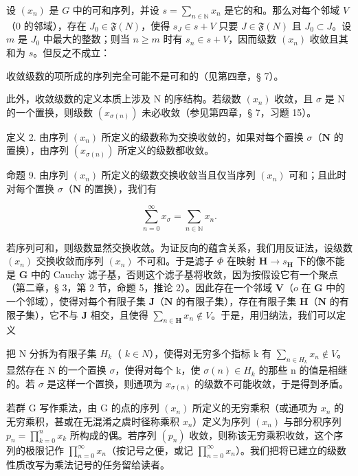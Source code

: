 设 \((x_{n})\) 是 \(G\) 中的可和序列，并设 \(s = \sum_{n\in \mathbb{N}}x_n\) 是它的和。那么对每个邻域 \(V\)（\(0\) 的邻域），存在 \(J_0\in \mathfrak{F}(N)\)，使得 \(s_J\in s + V\) 只要 \(J\in \mathfrak{F}(N)\) 且 \(J_0\subset J\)。设 \(m\) 是 \(J_0\) 中最大的整数；则当 \(n\geqslant m\) 时有 \(s_n\in s + V\)，因而级数 \((x_{n})\) 收敛且其和为 \(s\)。但反之不成立：

收敛级数的项所成的序列完全可能不是可和的（见第四章，§ 7）。

此外，收敛级数的定义本质上涉及 N 的序结构。若级数 \((x_{n})\) 收敛，且 \(\sigma\) 是 N 的一个置换，则级数 \((x_{\sigma(n)})\) 未必收敛（参见第四章，§ 7，习题 15）。

定义 2. 由序列 \((x_{n})\) 所定义的级数称为交换收敛的，如果对每个置换 \(\sigma\)（\(\mathbf{N}\) 的置换），由序列 \((x_{\sigma(n)})\) 所定义的级数都收敛。

命题 9. 由序列 \((x_{n})\) 所定义的级数交换收敛当且仅当序列 \((x_{n})\) 可和；且此时对每个置换 \(\sigma\)（\(\mathbf{N}\) 的置换），我们有

\[
\sum_ {n = 0} ^ {\infty} x _ {\sigma} = \sum_ {n \in \mathbb {N}} x _ {n}.
\]

若序列可和，则级数显然交换收敛。为证反向的蕴含关系，我们用反证法，设级数 \((x_{n})\) 交换收敛而序列 \((x_{n})\) 不可和。于是滤子 \(\Phi\) 在映射 \(\mathbf{H} \to s_{\mathbf{H}}\) 下的像不能是 \(\mathbf{G}\) 中的 Cauchy 滤子基，否则这个滤子基将收敛，因为按假设它有一个聚点（第二章，§ 3，第 2 节，命题 5，推论 2）。因此存在一个邻域 \(\mathbf{V}\)（\(o\) 在 \(\mathbf{G}\) 中的一个邻域），使得对每个有限子集 \(\mathbf{J}\)（\(\mathbf{N}\) 的有限子集），存在有限子集 \(\mathbf{H}\)（\(\mathbf{N}\) 的有限子集），它不与 \(\mathbf{J}\) 相交，且使得 \(\sum_{n \in \mathbf{H}} x_{n} \notin V\)。于是，用归纳法，我们可以定义

把 N 分拆为有限子集 \(H_{k}\)（ \(k \in N\)），使得对无穷多个指标 k 有 \(\sum_{n \in H_{k}} x_{n} \notin V\)。显然存在 N 的一个置换 \(\sigma\)，使得对每个 k，使 \(\sigma(n) \in H_{k}\) 的那些 n 的值是相继的。若 \(\sigma\) 是这样一个置换，则通项为 \(x_{\sigma(n)}\) 的级数不可能收敛，于是得到矛盾。

若群 G 写作乘法，由 G 的点的序列 \((x_{n})\) 所定义的无穷乘积（或通项为 \(x_{n}\) 的无穷乘积，甚或在无混淆之虞时径称乘积 \(x_{n}\)）定义为序列 \((x_{n})\) 与部分积序列 \(p_{n}=\prod_{k=0}^{n}x_{k}\) 所构成的偶。若序列 \((p_{n})\) 收敛，则称该无穷乘积收敛，这个序列的极限记作 \(\prod_{n=0}^{\infty}x_{n}\)（按记号之便，或记 \(\prod_{n=0}^{\infty}x_{n}\)）。我们把将已建立的级数性质改写为乘法记号的任务留给读者。

